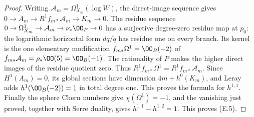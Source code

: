 \begin{proof}
Writing $\mathcal A_m=\Omega^1_{X_m}(\log W)$, the direct-image
sequence gives
$0\to A_m\to R^1f_{m*}\mathcal A_m\to K_m\to0$.
The residue sequence
$0\to\Omega^1_{X_m}\to\mathcal A_m\to\nu_*\OO_P\to0$
has a surjective degree-zero residue map at $p_0$: the logarithmic
horizontal form $dq/q$ has residue one on every branch. Its kernel
is the one elementary modification
$f_{m*}\Omega^1=\OO_B(-2)$ of
$f_{m*}\mathcal A_m=\rho_*\OO(5)=\OO_B(-1)$.
The rationality of $P$ makes the higher direct images of the
residue quotient zero. Thus
$R^1f_{m*}\Omega^1=R^1f_{m*}\mathcal A_m$.
Since $H^1(A_m)=0$, its global sections have dimension
$4m+h^0(K_m)$, and Leray adds
$h^1(\OO_B(-2))=1$ in total degree one. This proves the formula
for $h^{1,1}$. Finally the sphere Chern numbers give
$\chi(\Omega^1)=-1$, and the vanishing just proved, together with
Serre duality, gives $h^{1,1}-h^{1,2}=1$. This proves (E.5).
\end{proof}

